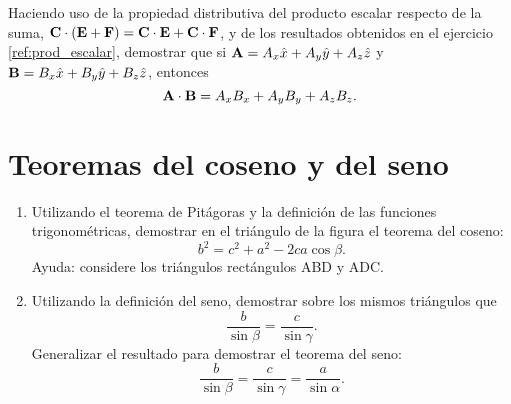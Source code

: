 \documentclass[a4paper, 12pt, fleqn]{article}
\begin{document}
Haciendo uso de la propiedad distributiva del producto escalar respecto de la suma, ${\bf C} \cdot \left( {\bf E} + {\bf F} \right) = {\bf C} \cdot {\bf E} + {\bf C} \cdot {\bf F}$, y de los resultados obtenidos en el ejercicio \ref{ref:prod_escalar}, demostrar que si ${\bf A} = A_x \hat{x} + A_y \hat{y} + A_z \hat{z} $ y ${\bf B} = B_x \hat{x} + B_y \hat{y} + B_z \hat{z} $, entonces $$ {\bf A} \cdot {\bf B} = A_x B_x + A_y B_y + A_z B_z. $$

\section{Teoremas del coseno y del seno}

\begin{enumerate}[label=(\alph*)]
    \item Utilizando el teorema de Pitágoras y la definición de las funciones trigonométricas, demostrar en el triángulo de la figura el teorema del coseno: $$ b^2 = c^2 + a^2 - 2ca \cos \beta. $$ Ayuda: considere los triángulos rectángulos ABD y ADC.
    
    \begin{center}
    \end{center}

    \item Utilizando la definición del seno, demostrar sobre los mismos triángulos que $$ \frac{b}{\sin \beta} = \frac{c}{\sin \gamma}. $$ Generalizar el resultado para demostrar el teorema del seno: $$ \frac{b}{\sin \beta} = \frac{c}{\sin \gamma} = \frac{a}{\sin \alpha}. $$
\end{enumerate}
\end{document}
